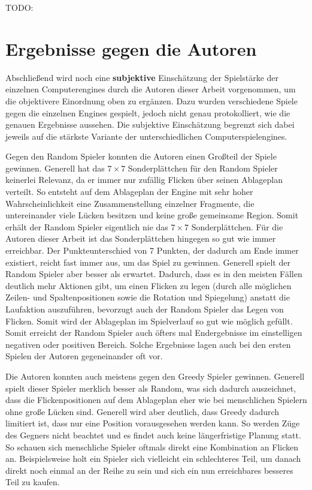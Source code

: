 TODO:

\pagebreak

\section{Ergebnisse gegen die Autoren}

Abschließend wird noch eine \textbf{subjektive} Einschätzung der Spielstärke der einzelnen Computerengines durch die Autoren dieser Arbeit vorgenommen, um die objektivere Einordnung oben zu ergänzen. Dazu wurden verschiedene Spiele gegen die einzelnen Engines gespielt, jedoch nicht genau protokolliert, wie die genauen Ergebnisse aussehen. Die subjektive Einschätzung begrenzt sich dabei jeweils auf die stärkste Variante der unterschiedlichen Computerspielengines.

Gegen den Random Spieler konnten die Autoren einen Großteil der Spiele gewinnen. Generell hat das $7\times 7$ Sonderplättchen für den Random Spieler keinerlei Relevanz, da er immer nur zufällig Flicken über seinen Ablageplan verteilt. So entsteht auf dem Ablageplan der Engine mit sehr hoher Wahrscheinlichkeit eine Zusammenstellung einzelner Fragmente, die untereinander viele Lücken besitzen und keine große gemeinsame Region. Somit erhält der Random Spieler eigentlich nie das $7\times 7$ Sonderplättchen. Für die Autoren dieser Arbeit ist das Sonderplättchen hingegen so gut wie immer erreichbar. Der Punkteunterschied von 7 Punkten, der dadurch am Ende immer existiert, reicht fast immer aus, um das Spiel zu gewinnen. Generell spielt der Random Spieler aber besser als erwartet. Dadurch, dass es in den meisten Fällen deutlich mehr Aktionen gibt, um einen Flicken zu legen (durch alle möglichen Zeilen- und Spaltenpositionen sowie die Rotation und Spiegelung) anstatt die Laufaktion auszuführen, bevorzugt auch der Random Spieler das Legen von Flicken. Somit wird der Ablageplan im Spielverlauf so gut wie möglich gefüllt. Somit erreicht der Random Spieler auch öfters mal Endergebnisse im einstelligen negativen oder positiven Bereich. Solche Ergebnisse lagen auch bei den ersten Spielen der Autoren gegeneinander oft vor.

Die Autoren konnten auch meistens gegen den Greedy Spieler gewinnen. Generell spielt dieser Spieler merklich besser als Random, was sich dadurch auszeichnet, dass die Flickenpositionen auf dem Ablageplan eher wie bei menschlichen Spielern ohne große Lücken sind. Generell wird aber deutlich, dass Greedy dadurch limitiert ist, dass nur eine Position vorausgesehen werden kann. So werden Züge des Gegners nicht beachtet und es findet auch keine längerfristige Planung statt. So schauen sich menschliche Spieler oftmals direkt eine Kombination an Flicken an. Beispielsweise holt ein Spieler sich vielleicht ein schlechteres Teil, um danach direkt noch einmal an der Reihe zu sein und sich ein nun erreichbares besseres Teil zu kaufen.

